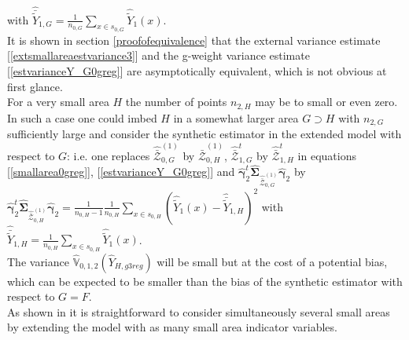 \documentclass[a4paper,12pt,leqno, titlepage]{article}
\newcommand{\VAR}{\mathbb{V}}
\begin{document}
\noindent with $\hat{\bar{\tilde{Y}}}_{1,G}=\frac{1}{n_{0,G}}\sum_{x\in{s_{0,G}}}\hat{\tilde{Y}}_1(x)$.\\
It is shown in section \ref{proofofequivalence} that the external variance estimate [\ref{extsmallareaestvariance3}]
and the g-weight variance estimate [\ref{estvarianceY_G0greg}] are asymptotically equivalent, which is not obvious at first glance.\\
For a very small area $H$ the number of points $n_{2,H}$ may be to small or even zero. In such a case one could imbed $H$ in a somewhat larger area $G\supset H$ with $n_{2,G}$ sufficiently large and consider the synthetic estimator in the extended model with respect to $G$: i.e. one replaces $\hat{\bar{\pmb{\mathcal{Z}}}}^{(1)}_{0,G}$ by $\hat{\bar{\pmb{\mathcal{Z}}}}^{(1)}_{0,H}$, $\hat{\bar{\pmb{\mathcal{Z}}}}^{t}_{1,G}$ by $\hat{\bar{\pmb{\mathcal{Z}}}}^{t}_{1,H}$  in equations [\ref{smallarea0greg}], [\ref{estvarianceY_G0greg}] and
$\hat{\pmb{\gamma}}_2^t\hat{\pmb{\Sigma}}_{\hat{\bar{\pmb{\mathcal{Z}}}}^{(1)}_{0,G}}\hat{\pmb{\gamma}}_2$ by
$\hat{\pmb{\gamma}}_2^t\hat{\pmb{\Sigma}}_{\hat{\bar{\pmb{\mathcal{Z}}}}^{(1)}_{0,H}}\hat{\pmb{\gamma}}_2
=\frac{1}{n_{0,H}-1}\frac{1}{n_{0,H}}\sum_{x\in{s_{0,H}}}(\hat{\tilde{Y}}_1(x)-\hat{\bar{\tilde{Y}}}_{1,H})^2$ with
$\hat{\bar{\tilde{Y}}}_{1,H}=\frac{1}{n_{0,H}}\sum_{x\in{s_{0,H}}}\hat{\tilde{Y}}_1(x)$.\\
The variance $\hat{\VAR}_{0,1,2}(\hat{Y}_{H,g3reg})$ will be small but at the cost of a potential bias, which can be expected to be smaller than the bias of the synthetic estimator with respect to $G=F$.\\
As shown in \cite{mandallazreport1} it is straightforward to consider simultaneously several
small areas by extending the model with as many small area indicator variables.\\
\end{document}
